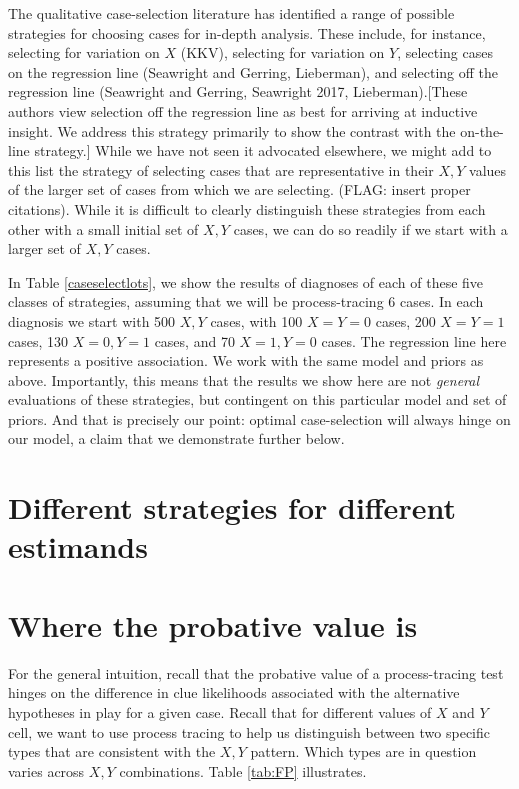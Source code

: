 \documentclass[12pt,]{book}
\begin{document}
The qualitative case-selection literature has identified a range of possible strategies for choosing cases for in-depth analysis. These include, for instance, selecting for variation on \(X\) (KKV), selecting for variation on \(Y\), selecting cases on the regression line (Seawright and Gerring, Lieberman), and selecting off the regression line (Seawright and Gerring, Seawright 2017, Lieberman).{[}These authors view selection off the regression line as best for arriving at inductive insight. We address this strategy primarily to show the contrast with the on-the-line strategy.{]} While we have not seen it advocated elsewhere, we might add to this list the strategy of selecting cases that are representative in their \(X,Y\) values of the larger set of cases from which we are selecting. (FLAG: insert proper citations). While it is difficult to clearly distinguish these strategies from each other with a small initial set of \(X, Y\) cases, we can do so readily if we start with a larger set of \(X,Y\) cases.

In Table \ref{caseselectlots}, we show the results of diagnoses of each of these five classes of strategies, assuming that we will be process-tracing 6 cases. In each diagnosis we start with 500 \(X, Y\) cases, with 100 \(X=Y=0\) cases, 200 \(X=Y=1\) cases, 130 \(X=0, Y=1\) cases, and 70 \(X=1, Y=0\) cases. The regression line here represents a positive association. We work with the same model and priors as above. Importantly, this means that the results we show here are not \emph{general} evaluations of these strategies, but contingent on this particular model and set of priors. And that is precisely our point: optimal case-selection will always hinge on our model, a claim that we demonstrate further below.

\hypertarget{different-strategies-for-different-estimands}{%
\section{Different strategies for different estimands}\label{different-strategies-for-different-estimands}}

\hypertarget{where-the-probative-value-is}{%
\section{Where the probative value is}\label{where-the-probative-value-is}}

For the general intuition, recall that the probative value of a process-tracing test hinges on the difference in clue likelihoods associated with the alternative hypotheses in play for a given case. Recall that for different values of \(X\) and \(Y\) cell, we want to use process tracing to help us distinguish between two specific types that are consistent with the \(X, Y\) pattern. Which types are in question varies across \(X,Y\) combinations. Table \ref{tab:FP} illustrates.
\end{document}
